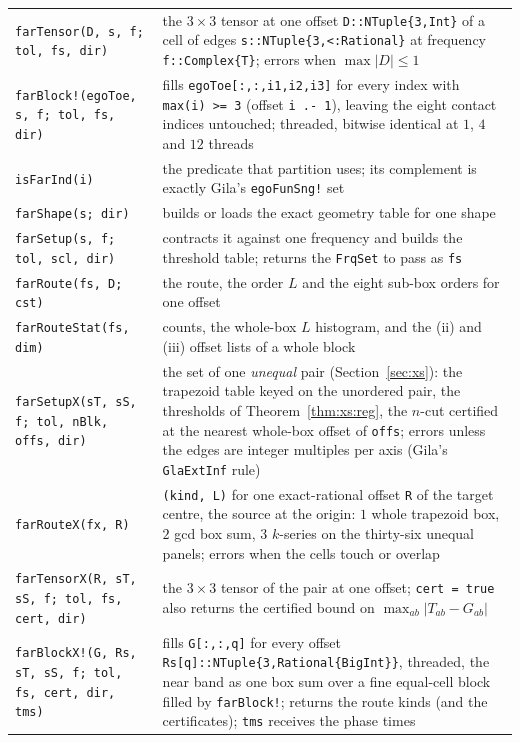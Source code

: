 \documentclass[11pt]{article}
\theoremstyle{remark}
\newcommand{\code}[1]{\texttt{#1}}
\begin{document}
\begin{center}\small
\begin{tabular}{@{}L{0.44\textwidth}L{0.5\textwidth}@{}}
\toprule
\code{farTensor(D, s, f; tol, fs, dir)} & the $3\times3$ tensor at one offset
\code{D::NTuple\{3,Int\}} of a cell of edges \code{s::NTuple\{3,<:Rational\}} at frequency
\code{f::Complex\{T\}}; errors when $\max|D| \le 1$\\
\code{farBlock!(egoToe, s, f; tol, fs, dir)} & fills \code{egoToe[:,:,i1,i2,i3]} for every
index with \code{max(i) >= 3} (offset \code{i .- 1}), leaving the eight contact indices
untouched; threaded, bitwise identical at $1$, $4$ and $12$ threads\\
\code{isFarInd(i)} & the predicate that partition uses; its complement is exactly Gila's
\code{egoFunSng!} set\\
\code{farShape(s; dir)} & builds or loads the exact geometry table for one shape\\
\code{farSetup(s, f; tol, scl, dir)} & contracts it against one frequency and builds the
threshold table; returns the \code{FrqSet} to pass as \code{fs}\\
\code{farRoute(fs, D; cst)} & the route, the order $L$ and the eight sub-box orders for one
offset\\
\code{farRouteStat(fs, dim)} & counts, the whole-box $L$ histogram, and the (ii) and (iii)
offset lists of a whole block\\
\midrule
\code{farSetupX(sT, sS, f; tol, nBlk, offs, dir)} & the set of one \emph{unequal} pair
(Section~\ref{sec:xs}): the trapezoid table keyed on the unordered pair, the thresholds of
Theorem~\ref{thm:xs:reg}, the $n$-cut certified at the nearest whole-box offset of
\code{offs}; errors unless the edges are integer multiples per axis (Gila's
\code{GlaExtInf} rule)\\
\code{farRouteX(fx, R)} & \code{(kind, L)} for one exact-rational offset \code{R} of the
target centre, the source at the origin: $1$ whole trapezoid box, $2$ gcd box sum, $3$
$k$-series on the thirty-six unequal panels; errors when the cells touch or overlap\\
\code{farTensorX(R, sT, sS, f; tol, fs, cert, dir)} & the $3\times3$ tensor of the pair
at one offset; \code{cert = true} also returns the certified bound on
$\max_{ab}|T_{ab}-G_{ab}|$\\
\code{farBlockX!(G, Rs, sT, sS, f; tol, fs, cert, dir, tms)} & fills
\code{G[:,:,q]} for every offset \code{Rs[q]::NTuple\{3,Rational\{BigInt\}\}}, threaded,
the near band as one box sum over a fine equal-cell block filled by \code{farBlock!};
returns the route kinds (and the certificates); \code{tms} receives the phase times\\
\bottomrule
\end{tabular}
\end{center}
\end{document}
